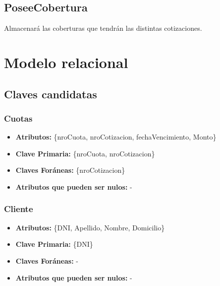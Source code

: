 \documentclass[a4paper,11pt]{article}
\begin{document}
\subsection{PoseeCobertura}

Almacenará las coberturas que tendrán las distintas cotizaciones.


\section{Modelo relacional}

\subsection{Claves candidatas}

\subsubsection{Cuotas}

\begin{itemize}

	\item \textbf{Atributos:} \{nroCuota, nroCotizacion, fechaVencimiento, Monto\}

	\item \textbf{Clave Primaria:} \{nroCuota, nroCotizacion\}

	\item \textbf{Claves Foráneas:} \{nroCotizacion\}

	\item \textbf{Atributos que pueden ser nulos:} -
	
\end{itemize}

\subsubsection{Cliente}

\begin{itemize}

	\item \textbf{Atributos:} \{DNI, Apellido, Nombre, Domicilio\}

	\item \textbf{Clave Primaria:} \{DNI\}

	\item \textbf{Claves Foráneas:} -

	\item \textbf{Atributos que pueden ser nulos:} -
	
\end{itemize}
\end{document}
